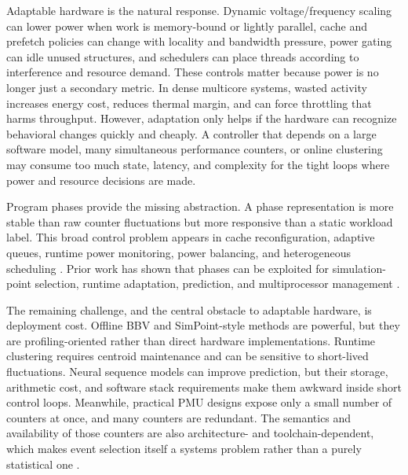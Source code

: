 \documentclass[10pt,twocolumn]{article}
\begin{document}
Adaptable hardware is the natural response.
Dynamic voltage/frequency scaling can lower power when work is memory-bound or lightly parallel, cache and prefetch policies can change with locality and bandwidth pressure, power gating can idle unused structures, and schedulers can place threads according to interference and resource demand.
These controls matter because power is no longer just a secondary metric.
In dense multicore systems, wasted activity increases energy cost, reduces thermal margin, and can force throttling that harms throughput.
However, adaptation only helps if the hardware can recognize behavioral changes quickly and cheaply.
A controller that depends on a large software model, many simultaneous performance counters, or online clustering may consume too much state, latency, and complexity for the tight loops where power and resource decisions are made.

Program phases provide the missing abstraction.
A phase representation is more stable than raw counter fluctuations but more responsive than a static workload label.
This broad control problem appears in cache reconfiguration, adaptive queues, runtime power monitoring, power balancing, and heterogeneous scheduling \cite{balasubramonian2000memory,albonesi1999selective,buyuktosunoglu2000drowsy,isci2003runtime,merkel2006balancing,dhiman2009dynamic,petrucci2012lucky,carpentieri2025frequency}.
Prior work has shown that phases can be exploited for simulation-point selection, runtime adaptation, prediction, and multiprocessor management \cite{sherwood2001bbda,sherwood2002simpoint,hamerly2005simpoint3,sherwood2003phase,chang2013sampling,perelman2006parallel,ding2006programphase,kim2017p4,ziedan2016runtime,nomani2015predicting,lozano2022phase,carpentieri2025frequency}.

The remaining challenge, and the central obstacle to adaptable hardware, is deployment cost.
Offline BBV and SimPoint-style methods are powerful, but they are profiling-oriented rather than direct hardware implementations.
Runtime clustering requires centroid maintenance and can be sensitive to short-lived fluctuations.
Neural sequence models can improve prediction, but their storage, arithmetic cost, and software stack requirements make them awkward inside short control loops.
Meanwhile, practical PMU designs expose only a small number of counters at once, and many counters are redundant.
The semantics and availability of those counters are also architecture- and toolchain-dependent, which makes event selection itself a systems problem rather than a purely statistical one \cite{eyerman2006cpi,hennessy2019computer,intel2024optimization,intel2024sdm,linux2024perf,perfwiki2024}.
\end{document}
